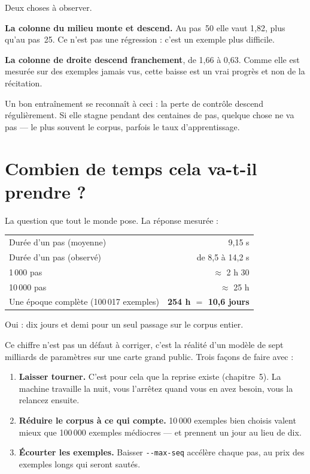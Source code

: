 Deux choses à observer.

\textbf{La colonne du milieu monte et descend.} Au pas~50 elle vaut 1,82, plus
qu'au pas~25. Ce n'est pas une régression : c'est un exemple plus difficile.

\textbf{La colonne de droite descend franchement}, de 1,66 à 0,63. Comme elle
est mesurée sur des exemples jamais vus, cette baisse est un vrai progrès et non
de la récitation.

\begin{nkretenir}
Un bon entraînement se reconnaît à ceci : la perte de contrôle descend
régulièrement. Si elle stagne pendant des centaines de pas, quelque chose ne va
pas — le plus souvent le corpus, parfois le taux d'apprentissage.
\end{nkretenir}

\section{Combien de temps cela va-t-il prendre ?}

La question que tout le monde pose. La réponse mesurée :

\begin{center}
\begin{tabular}{lr}
\toprule
Durée d'un pas (moyenne) & 9,15 s \\
Durée d'un pas (observé) & de 8,5 à 14,2 s \\
\midrule
1\,000 pas & $\approx$ 2 h 30 \\
10\,000 pas & $\approx$ 25 h \\
Une époque complète (100\,017 exemples) & \textbf{254 h $=$ 10,6 jours} \\
\bottomrule
\end{tabular}
\end{center}

Oui : dix jours et demi pour un seul passage sur le corpus entier.

Ce chiffre n'est pas un défaut à corriger, c'est la réalité d'un modèle de sept
milliards de paramètres sur une carte grand public. Trois façons de faire avec :

\begin{enumerate}
  \item \textbf{Laisser tourner.} C'est pour cela que la reprise existe
        (chapitre~5). La machine travaille la nuit, vous l'arrêtez quand vous
        en avez besoin, vous la relancez ensuite.
  \item \textbf{Réduire le corpus à ce qui compte.} 10\,000 exemples bien
        choisis valent mieux que 100\,000 exemples médiocres — et prennent un
        jour au lieu de dix.
  \item \textbf{Écourter les exemples.} Baisser \texttt{-{}-max-seq} accélère
        chaque pas, au prix des exemples longs qui seront sautés.
\end{enumerate}

